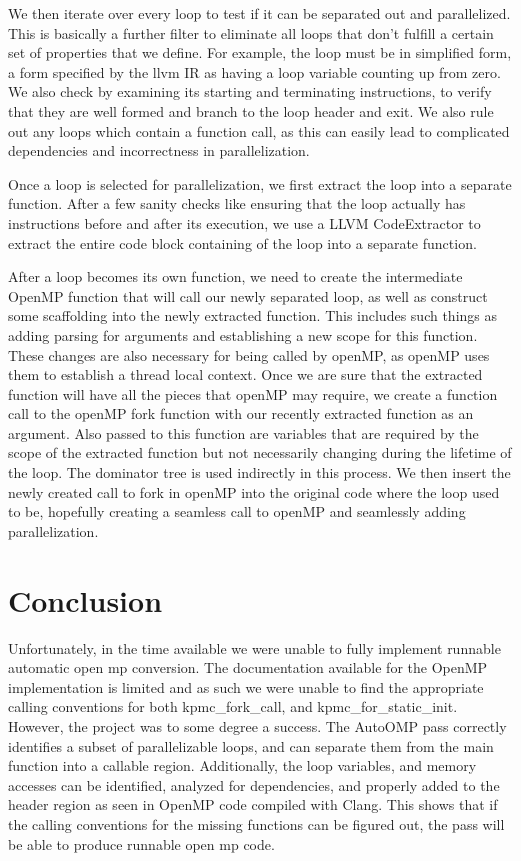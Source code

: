 \documentclass[conference]{IEEEtran}
\begin{document}
We then iterate over every loop to test if it can be separated out and
parallelized. This is basically a further filter to eliminate all
loops that don't fulfill a certain set of properties that we
define. For example, the loop must be in simplified form, a form specified
by the llvm IR as having a loop variable counting up from zero. We also
check by examining its starting and terminating instructions, to verify
that they are well formed and branch to the loop header and exit. We also
rule out any loops which contain a function call, as this can easily
lead to complicated dependencies and incorrectness in parallelization.

Once a loop is selected for parallelization, we first extract the loop
into a separate function. After a few sanity checks like ensuring that
the loop actually has instructions before and after its execution, we
use a LLVM CodeExtractor to extract the entire code block containing
of the loop into a separate function.

After a loop becomes its own function, we need to create the
intermediate OpenMP function that will call our newly separated loop,
as well as construct some scaffolding into the newly extracted
function. This includes such things as adding parsing for arguments
and establishing a new scope for this function. These changes are also
necessary for being called by openMP, as openMP uses them to establish
a thread local context. Once we are sure that the extracted function
will have all the pieces that openMP may require, we create a function
call to the openMP fork function with our recently extracted function
as an argument. Also passed to this function are variables that are
required by the scope of the extracted function but not necessarily
changing during the lifetime of the loop. The dominator tree is used
indirectly in this process. We then insert the newly created call to
fork in openMP into the original code where the loop used to be,
hopefully creating a seamless call to openMP and seamlessly adding
parallelization.




\section{Conclusion}

Unfortunately, in the time available we were unable to fully implement runnable automatic
open mp conversion. The documentation available for the OpenMP implementation is limited
and as such we were unable to find the appropriate calling conventions for both
kpmc_fork_call, and kpmc_for_static_init. However, the project was to some degree a success.
The AutoOMP pass correctly identifies a subset of parallelizable loops, and can separate them
from the main function into a callable region. Additionally, the loop variables, and memory accesses
can be identified, analyzed for dependencies, and properly added to the header region as seen in 
OpenMP code compiled with Clang. This shows that if the calling conventions for the missing 
functions can be figured out, the pass will be able to produce runnable open mp code. 
\end{document}
